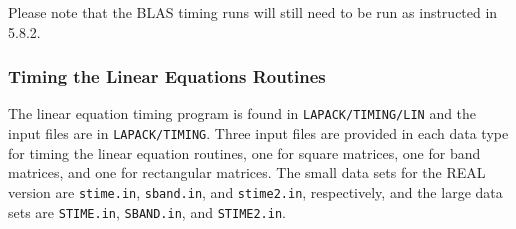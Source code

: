 Please note that the BLAS
timing runs will still need to be run as instructed in 5.8.2.

\subsubsection{Timing the Linear Equations Routines}

\dent
The linear equation timing program is found in {\tt LAPACK/TIMING/LIN}
and the input files are in {\tt LAPACK/TIMING}.
Three input files are provided in each data type for timing the
linear equation routines, one for square matrices, one for band
matrices, and one for rectangular matrices.  The small data sets for the REAL version
are {\tt stime.in}, {\tt sband.in}, and {\tt stime2.in}, respectively,
and the large data sets are
{\tt STIME.in}, {\tt SBAND.in}, and {\tt STIME2.in}.

